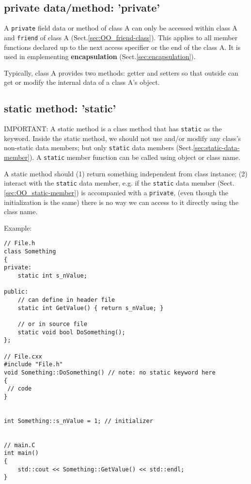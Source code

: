 \subsection{private data/method: 'private'}

A \verb!private! field data or method of class A can only be accessed within
class A and \verb!friend! of class A (Sect.\ref{sec:OO_friend-class}). This
applies to all member functions declared up to the next access specifier or the
end of the class A.
It is used in emplementing {\bf encapsulation} (Sect.\ref{sec:encapsulation}).

Typically, class A provides two methods: getter and setters so that outside can
get or modify the internal data of a class A's object.

\subsection{static method: 'static'}
\label{sec:static-method}

IMPORTANT: A static method is a class method that has \verb!static! as the
keyword. Inside the static method, we should not use and/or modify any class's
non-static data members; but only \verb!static! data members
(Sect.\ref{sec:static-data-member}).
A \verb!static! member function can be called using object or class name.

A static method should (1) return something independent from class instance; (2)
interact with the \verb!static! data member, e.g.
if the \verb!static! data member (Sect.\ref{sec:OO_static-member}) is
accompanied with a \verb!private!, (even though the initialization is the same)
there is no way we can access to it directly using the class name. 

Example:
\begin{lstlisting}
// File.h
class Something
{
private:
    static int s_nValue;
    
public:
    // can define in header file
    static int GetValue() { return s_nValue; }
    
    // or in source file
    static void bool DoSomething(); 
};

// File.cxx
#include "File.h"
void Something::DoSomething() // note: no static keyword here
{
 // code
} 
 
 
int Something::s_nValue = 1; // initializer
 
 
// main.C
int main()
{
    std::cout << Something::GetValue() << std::endl;
} 
\end{lstlisting}

